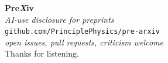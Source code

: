\documentclass[10pt,aspectratio=43]{beamer}
\newcommand{\PreXiv}{\textbf{Pre}\textbf{\textit{\color{prexivrust}X}}\textbf{iv}}
\begin{document}
\begin{frame}
  \centering
  \vspace{1em}
  {\Huge\PreXiv}\\[10pt]
  {\Large\itshape\color{prexivmuted}AI-use disclosure for preprints}\\[28pt]
  \large\texttt{github.com/PrinciplePhysics/pre-arxiv}\\[6pt]
  {\small\color{prexivmuted}\itshape open issues, pull requests, criticism welcome}\\[28pt]
  {\small Thanks for listening.}
\end{frame}
\end{document}
